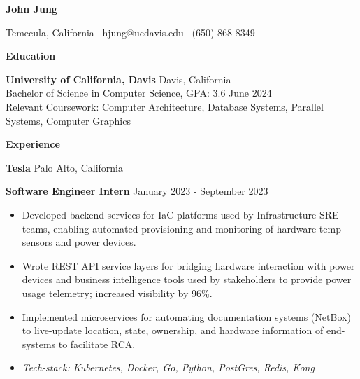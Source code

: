 \documentclass[11pt]{article}
\begin{document}
\begin{center}
    {\huge \textbf{John Jung}}\\ 
    \hrulefill
\end{center}

\begin{center}
    Temecula, California \textbullet \ hjung@ucdavis.edu \textbullet \ (650) 868-8349
\end{center}

\vspace{0.5pt}


\begin{center}
    \textbf{Education}
\end{center}
\textbf{University of California, Davis} \hfill Davis, California\\
Bachelor of Science in Computer Science, GPA: 3.6 \hfill June 2024\\
Relevant Coursework: Computer Architecture, Database Systems, Parallel Systems, Computer Graphics
\vspace{12pt}


\begin{center}
    \textbf{Experience}
\end{center}
\textbf{Tesla} \hfill Palo Alto, California

\textbf{Software Engineer Intern} \hfill January 2023 - September 2023
\begin{itemize}[noitemsep, topsep=0pt, partopsep=0pt, parsep=0pt]
    \item Developed backend services for IaC platforms used by Infrastructure SRE teams, enabling automated provisioning and monitoring of hardware temp sensors and power devices.
    \item Wrote REST API service layers for bridging hardware interaction with power devices and business intelligence tools used by stakeholders to provide power usage telemetry; increased visibility by 96\%.
    \item Implemented microservices for automating documentation systems (NetBox) to live-update location, state, ownership, and hardware information of end-systems to facilitate RCA.
    \item \textit{Tech-stack: Kubernetes, Docker, Go, Python, PostGres, Redis, Kong}
\end{itemize}

\vspace{12pt}
\end{document}

